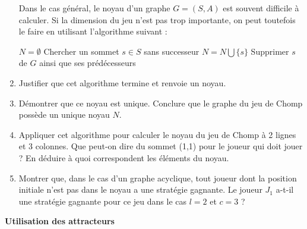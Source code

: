 \documentclass{ccinp}
\begin{document}
\begin{enumerate}[resume]
Dans le cas général, le noyau d’un graphe $G=(S,A)$ est souvent difficile à calculer. Si la dimension du jeu n’est pas trop importante, on peut toutefois le faire en utilisant l'algorithme suivant : 
 \begin{center}
 \begin{minipage}{95mm}
  \begin{pcode-env}
  $N = \emptyset$ \;
  {
  Chercher un sommet $s\in S$ sans successeur \;
  $N = N\bigcup \{s\}$ \;
  Supprimer $s$ de $G$ ainsi que ses prédécesseurs \;
  }
  \end{pcode-env}
\end{minipage}
\end{center}
\item Justifier que cet algorithme termine et renvoie un noyau.
\item Démontrer que ce noyau est unique. Conclure que le graphe du jeu de Chomp possède un unique noyau $N$. 
\item Appliquer cet algorithme pour calculer le noyau du jeu de Chomp à 2 lignes et 3 colonnes. Que peut-on dire du sommet (1,1) pour le joueur qui doit jouer ? En déduire à quoi correspondent les éléments du noyau.
\item Montrer que, dans le cas d'un graphe acyclique, tout joueur dont la position initiale n’est pas dans le noyau a une stratégie gagnante. Le joueur $J_1$ a-t-il une stratégie gagnante pour ce jeu dans le cas $l=2$ et $c=3$ ?
\end{enumerate}

\medskip
\textbf{Utilisation des attracteurs}
\end{document}
